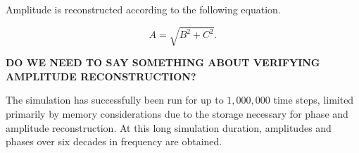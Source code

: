 Amplitude is reconstructed according to the following equation. 

\begin{equation}
A = \sqrt{B^2+C^2}.
\label{eqn:amplitude}
\end{equation}


{\bf DO WE NEED TO SAY SOMETHING ABOUT VERIFYING AMPLITUDE RECONSTRUCTION?}


The simulation has successfully been run for up to $1,000,000$ time
steps, limited primarily by memory considerations due to the storage
necessary for phase and amplitude reconstruction. At this long
simulation duration, amplitudes and phases over six decades in
frequency are obtained.
